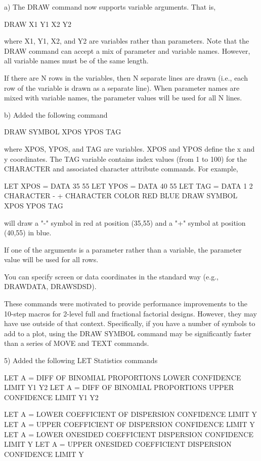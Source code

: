     a) The DRAW command now supports variable arguments.  That is,

           DRAW X1 Y1 X2 Y2

       where X1, Y1, X2, and Y2 are variables rather than parameters.
       Note that the DRAW command can accept a mix of parameter and
       variable names.  However, all variable names must be of the same
       length.

       If there are N rows in the variables, then N separate lines are
       drawn (i.e., each row of the variable is drawn as a separate line).
       When parameter names are mixed with variable names, the parameter
       values will be used for all N lines.

    b) Added the following command

           DRAW SYMBOL XPOS YPOS TAG

       where XPOS, YPOS, and TAG are variables.  XPOS and YPOS define
       the x and y coordinates.  The TAG variable contains index values
       (from 1 to 100) for the CHARACTER and associated character
       attribute commands.  For example,

           LET XPOS = DATA 35 55
           LET YPOS = DATA 40 55
           LET TAG  = DATA  1  2
           CHARACTER  - +
           CHARACTER COLOR RED BLUE
           DRAW SYMBOL XPOS YPOS TAG

        will draw a "-" symbol in red at position (35,55) and a "+" symbol
        at position (40,55) in blue.

        If one of the arguments is a parameter rather than a variable, the
        parameter value will be used for all rows.

        You can specify screen or data coordinates in the standard way
        (e.g., DRAWDATA, DRAWSDSD).

    These commands were motivated to provide performance improvements to
    the 10-step macros for 2-level full and fractional factorial designs.
    However, they may have use outside of that context.  Specifically,
    if you have a number of symbols to add to a plot, using the
    DRAW SYMBOL command may be significantly faster than a series of
    MOVE and TEXT commands.

 5) Added the following LET Statistics commands

       LET A = DIFF OF BINOMIAL PROPORTIONS LOWER CONFIDENCE LIMIT Y1 Y2
       LET A = DIFF OF BINOMIAL PROPORTIONS UPPER CONFIDENCE LIMIT Y1 Y2

       LET A = LOWER COEFFICIENT OF DISPERSION CONFIDENCE LIMIT Y
       LET A = UPPER COEFFICIENT OF DISPERSION CONFIDENCE LIMIT Y
       LET A = LOWER ONESIDED COEFFICIENT DISPERSION CONFIDENCE LIMIT Y
       LET A = UPPER ONESIDED COEFFICIENT DISPERSION CONFIDENCE LIMIT Y

